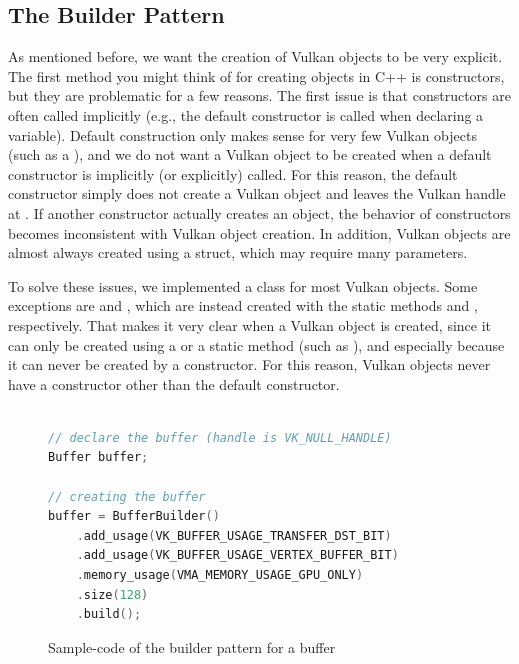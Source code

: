 \subsection{The Builder Pattern}\label{subsec:builder-pattern}
As mentioned before, we want the creation of Vulkan objects to be very explicit. The first method you might think of for creating objects in C++ is constructors, but they are problematic for a few reasons. The first issue is that constructors are often called implicitly (e.g., the default constructor is called when declaring a variable). Default construction only makes sense for very few Vulkan objects (such as a ), and we do not want a Vulkan object to be created when a default constructor is implicitly (or explicitly) called. For this reason, the default constructor simply does not create a Vulkan object and leaves the Vulkan handle at . If another constructor actually creates an object, the behavior of constructors becomes inconsistent with Vulkan object creation. In addition, Vulkan objects are almost always created using a  struct, which may require many parameters.

To solve these issues, we implemented a  class for most Vulkan objects. Some exceptions are  and , which are instead created with the static methods  and , respectively. That makes it very clear when a Vulkan object is created, since it can only be created using a  or a static method (such as ), and especially because it can never be created by a constructor. For this reason, Vulkan objects never have a constructor other than the default constructor.

\begin{figure}[H]
    \begin{lstlisting}[language=C++]

// declare the buffer (handle is VK_NULL_HANDLE)
Buffer buffer;

// creating the buffer
buffer = BufferBuilder()
    .add_usage(VK_BUFFER_USAGE_TRANSFER_DST_BIT)
    .add_usage(VK_BUFFER_USAGE_VERTEX_BUFFER_BIT)
    .memory_usage(VMA_MEMORY_USAGE_GPU_ONLY)
    .size(128)
    .build();


    \end{lstlisting}
    \caption{Sample-code of the builder pattern for a buffer}
    \label{fig:builder-pattern}
\end{figure}

